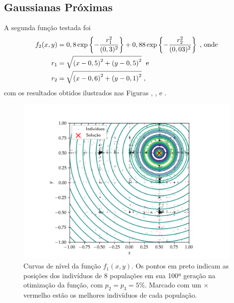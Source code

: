 \subsection{Gaussianas Próximas}

A segunda função testada foi
\begin{align}
    \begin{split}
        f_2(x,y) & = 0,8 \exp\left\{-\frac{r_1^2}{(0,3)^2}\right\} +
        0,88 \exp\left\{-\frac{r_2^2}{(0,03)^2}\right\} \;\text{, onde} \\
        r_1      & = \sqrt{
            \left(x - 0,5\right)^2 +
            \left(y - 0,5\right)^2
        } \;\text{ e} \\
        r_2      & = \sqrt{
            \left(x - 0,6\right)^2 +
            \left(y - 0,1\right)^2
        } \;\mathrm{,}
    \end{split}
    \label{eq:func_near_gaussians}
\end{align}
com os resultados obtidos ilustrados nas Figuras ,
,  e 
.

\begin{figure}[p]
    \centering
    \includegraphics[width=\textwidth]{imagens/low_prob/contour_damped_cossine.png}
    \caption{
        Curvas de nível da função $f_1(x,y)$. Os pontos em preto indicam as posições dos indivíduos
        de 8 populações em sua 100ª geração na otimização da função, com $ p_2 = p_3 = 5\% $. 
        Marcado com um $\times$ vermelho estão os melhores indivíduos de cada população.
    }
    \label{fig:contour_damped_cossine}
\end{figure}


